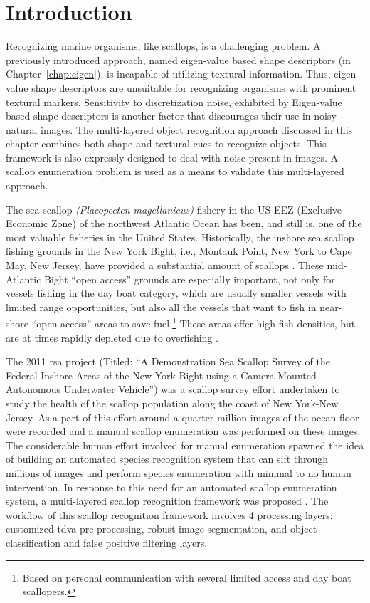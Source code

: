 \documentclass {udthesis}
\begin{document}
\section{Introduction}

Recognizing marine organisms, like scallops, is a challenging problem. A previously introduced approach, named eigen-value based shape descriptors (in Chapter~\ref{chap:eigen}), is incapable of utilizing textural information. Thus, eigen-value shape descriptors are unsuitable for recognizing organisms with prominent textural markers. Sensitivity to discretization noise, exhibited by Eigen-value based shape descriptors is another factor that discourages their use in noisy natural images. The multi-layered object recognition approach discussed in this chapter combines both shape and textural cues to recognize objects. This framework is also expressly designed to deal with noise present in images. A scallop enumeration problem is used as a means to validate this multi-layered approach.

The sea scallop \textit{(Placopecten magellanicus)} fishery in the 
US EEZ (Exclusive Economic Zone) of the northwest Atlantic Ocean has been, and still is, one of 
the most valuable fisheries in the United States. 
Historically, the inshore sea scallop fishing grounds in the New York Bight, 
i.e., Montauk Point, New York to Cape May, New Jersey, have provided 
a substantial amount of scallops \cite{caddy, serchuk, hart, naidu, fisheries}.
These mid-Atlantic Bight ``open access'' 
grounds are especially important, not only for vessels fishing in the day boat 
category, which are usually smaller vessels with limited range opportunities, 
but also all the vessels that want to fish in near-shore ``open access'' 
areas to save fuel.\footnote{Based on personal communication with several limited 
access and day boat scallopers.} 
These areas offer high fish densities, but are at times rapidly depleted due 
to overfishing \cite{rosenberg}.      

The 2011 \gls{rsa} 
project (Titled: ``A Demonstration Sea Scallop Survey of the 
Federal Inshore Areas of the New York Bight using a Camera Mounted Autonomous Underwater
Vehicle'') was a scallop survey effort undertaken to study the health of the scallop population
along the coast of New York-New Jersey. As a part of this effort around a quarter million images of the 
ocean floor were recorded and a manual scallop enumeration was performed on these images.
The considerable human effort involved for manual enumeration spawned the idea of building an automated species
recognition system that can sift through millions of images and perform species enumeration with minimal to no human intervention.
In response to this need for an automated scallop enumeration system, a multi-layered scallop
recognition framework was proposed \cite{prasanna_med, prasanna_aslo, prasanna_igi}.
The workflow of this scallop recognition framework involves 4 processing layers:
customized \gls{tdva} pre-processing, robust image 
segmentation, and object classification and false positive filtering layers. 
\end{document}
